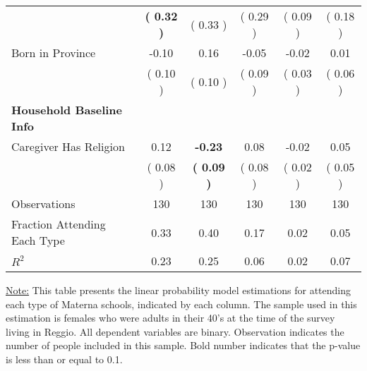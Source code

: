 \begin{table}[H]
{\begin{tabular}{lccccc}
\quad  & \textbf{(     0.32 )} & (     0.33 )  & (     0.29 )  & (     0.09 ) & (     0.18 ) \\
\quad Born in Province &     -0.10 &      0.16 &     -0.05 &     -0.02 &      0.01 \\
\quad  & (     0.10 ) & (     0.10 )  & (     0.09 )  & (     0.03 ) & (     0.06 ) \\
\midrule
\textbf{Household Baseline Info} \\
\quad Caregiver Has Religion &      0.12 & \textbf{    -0.23} &      0.08 &     -0.02 &      0.05 \\
\quad  & (     0.08 ) & \textbf{(     0.09 )}  & (     0.08 )  & (     0.02 ) & (     0.05 ) \\
\midrule
Observations & 130 & 130 & 130 & 130 & 130 \\
Fraction Attending Each Type &      0.33 &      0.40 &      0.17 &      0.02 &      0.05 \\
\midrule
$ R^2$ &      0.23 &      0.25 &      0.06 &      0.02 &      0.07 \\
\bottomrule
\end{tabular}}
\end{table}
\begin{footnotesize}
\noindent\underline{Note:} This table presents the linear probability model estimations for attending each type of Materna schools, indicated by each column. The sample used in this estimation is females who were adults in their 40's at the time of the survey living in Reggio. All dependent variables are binary. Observation indicates the number of people included in this sample. Bold number indicates that the p-value is less than or equal to 0.1.
\end{footnotesize}
